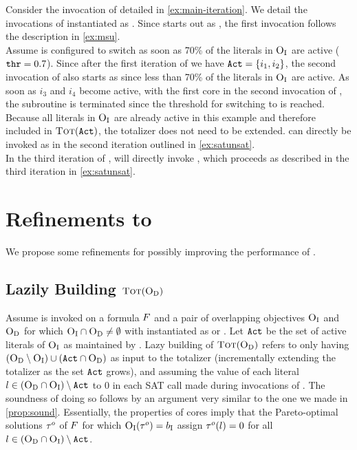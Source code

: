 \begin{example}
  Consider the invocation of \algname{} detailed in \cref{ex:main-iteration}.
  We detail the invocations of \Min{} instantiated as \msh{}.
  Since \msh{} starts out as \msu{}, the first invocation follows the description in \cref{ex:msu}. \\
  Assume \msh{} is configured to switch as soon as 70\% of the literals in $\textsc{O}_{\text{I}}$ are active ($\texttt{thr} = 0.7$).
  Since after the first iteration of \algname{} we have $\texttt{Act} = \{i_1, i_2\}$, the second invocation of \msh{} also starts as \msu{} since less than 70\% of the literals in $\textsc{O}_{\text{I}}$ are active.
  As soon as $i_3$ and $i_4$ become active, with the first core in the second invocation of \msu{}, the \msu{} subroutine is terminated since the threshold for switching to \satunsat{} is reached.
  Because all literals in $\textsc{O}_{\text{I}}$ are already active in this example and therefore included in $\textsc{Tot}(\texttt{Act})$, the totalizer does not need to be extended.
  \satunsat{} can directly be invoked as in the second iteration outlined in \cref{ex:satunsat}. \\
  In the third iteration of \algname{}, \msh{} will directly invoke \satunsat{}, which proceeds as described in the third iteration in \cref{ex:satunsat}.
\end{example}

\section{Refinements to \algname{}\label{sec:refinements}}

We propose some refinements for possibly improving the performance of \algname{}.

\subsection{Lazily Building $\textsc{Tot}(\textsc{O}_{\text{D}})$}

Assume \algname{} is invoked on a formula $F$ and a pair of overlapping objectives $\textsc{O}_{\text{I}}$ and $\textsc{O}_{\text{D}}$ for which $\textsc{O}_{\text{I}} \cap \textsc{O}_{\text{D}} \neq \emptyset$ with \Min{} instantiated as \msu{} or \oll{}.
Let $\texttt{Act}$ be the set of active literals of $\textsc{O}_{\text{I}}$ as maintained by \Min{}.
Lazy building of $\textsc{Tot}(\textsc{O}_{\text{D}})$ refers to only having $(\textsc{O}_{\text{D}} \setminus \textsc{O}_{\text{I}}) \cup  (\texttt{Act} \cap \textsc{O}_{\text{D}})$ as input to the totalizer (incrementally extending the totalizer as the set $\texttt{Act}$ grows), and assuming the value of each literal $l \in (\textsc{O}_{\text{D}} \cap \textsc{O}_{\text{I}}) \setminus \texttt{Act}$ to $0$ in each SAT call made during invocations of \Simpr{}.
The soundness of doing so follows by an argument very similar to the one we made in \cref{prop:sound}.
Essentially, the properties of cores imply that the Pareto-optimal solutions $\tau^o$ of $F$ for which $\textsc{O}_{\text{I}}(\tau^o) = b_{\text{I}}$ assign $\tau^o(l) = 0$ for all  $l \in (\textsc{O}_{\text{D}} \cap \textsc{O}_{\text{I}}) \setminus \texttt{Act}$. 

